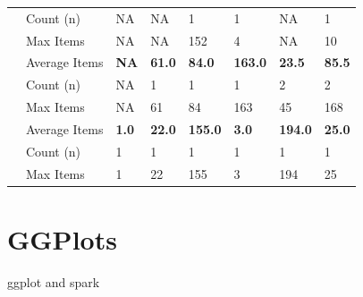 \documentclass[
  american,
  10,
  a4paper,
]{book}
\theoremstyle{definition}
\theoremstyle{remark}
\begin{document}
\begin{table}
\begin{tabular*}{\linewidth}
{} & {Count (n)} & {NA} & {NA} & {1} & {1} & {NA} & {1} \\ 
{} & {Max Items} & {NA} & {NA} & {152} & {4} & {NA} & {10} \\ 
{\bfseries {}} & Average Items & {\bfseries NA} & {\bfseries 61.0} & {\bfseries 84.0} & {\bfseries 163.0} & {\bfseries 23.5} & {\bfseries 85.5} \\ 
{} & {Count (n)} & {NA} & {1} & {1} & {1} & {2} & {2} \\ 
{} & {Max Items} & {NA} & {61} & {84} & {163} & {45} & {168} \\ 
{\bfseries {}} & Average Items & {\bfseries 1.0} & {\bfseries 22.0} & {\bfseries 155.0} & {\bfseries 3.0} & {\bfseries 194.0} & {\bfseries 25.0} \\ 
{} & {Count (n)} & {1} & {1} & {1} & {1} & {1} & {1} \\ 
{} & {Max Items} & {1} & {22} & {155} & {3} & {194} & {25} \\ 
\bottomrule
\end{tabular*}
\end{table}

\chapter{GGPlots}\label{ggplots}

ggplot and spark
\end{document}
